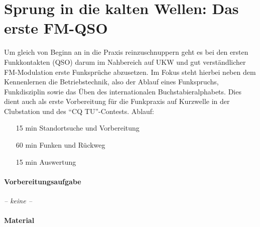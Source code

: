 
\clearpage

\section{Sprung in die kalten Wellen: Das erste FM-QSO} %

Um gleich von Beginn an in die Praxis reinzuschnuppern geht es bei den ersten
Funkkontakten (QSO) darum im Nahbereich auf UKW und gut verständlicher
FM-Modulation erste Funksprüche abzusetzen. Im Fokus steht hierbei neben dem
Kennenlernen die Betriebstechnik, also der Ablauf eines Funkspruchs,
Funkdisziplin sowie das Üben des internationalen Buchstabieralphabets. Dies
dient auch als erste Vorbereitung für die Funkpraxis auf Kurzwelle in der
Clubstation und des "`CQ TU"'-Contests. Ablauf:

\begin{enumerate}
  \item[15] min Standortsuche und Vorbereitung
  \item[60] min Funken und Rückweg
  \item[15] min Auswertung
\end{enumerate}

\paragraph{Vorbereitungsaufgabe}

\emph{-- keine --}

\paragraph{Material}

